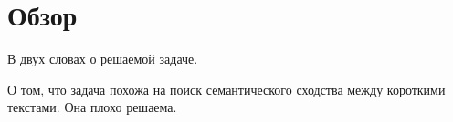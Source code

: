 \section{Обзор}
    В двух словах о решаемой задаче.

    О том, что задача похожа на поиск семантического сходства между короткими текстами. Она плохо решаема.

    
    
    
    
    




